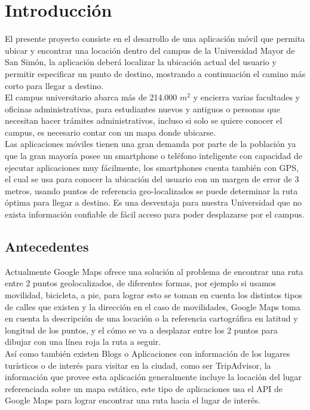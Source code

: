 \chapter{Introducción} %
\label{cha:introduccion}

El presente proyecto consiste en el desarrollo de una aplicación móvil que permita ubicar y encontrar una locación dentro del campus de la Universidad Mayor de San Simón, la aplicación deberá localizar la ubicación actual del usuario y permitir especificar un punto de destino, mostrando a continuación el camino más corto para llegar a destino.\\

El campus universitario abarca más de \num{214,000} $m^2$ y encierra varias facultades y oficinas administrativas, para estudiantes nuevos y antiguos o personas que
necesitan hacer trámites administrativos, incluso si solo se quiere conocer el
campus, es necesario contar con un mapa donde ubicarse.\\

Las aplicaciones móviles tienen una gran demanda por parte de la población ya
que la gran mayoría posee un smartphone o teléfono inteligente con capacidad de
ejecutar aplicaciones muy fácilmente, los smartphones cuenta también con GPS,
el cual se usa para conocer la ubicación del usuario con un margen de error de
3 metros, usando puntos de referencia geo-localizados se puede determinar la
ruta óptima para llegar a destino. Es una desventaja para nuestra Universidad que no exista información confiable de fácil acceso para poder desplazarse por el campus.\\

  \section{Antecedentes} %
  \label{sec:antecedentes}
  Actualmente Google Maps ofrece una solución al problema de encontrar una ruta entre 2 puntos geolocalizados, de diferentes formas, por ejemplo si usamos movilidad, bicicleta, a pie, para lograr esto se toman en cuenta los distintos tipos de calles que existen y la dirección en el caso de movilidades, Google Maps toma en cuenta la descripción de una locación o la referencia cartográfica en latitud y longitud de los puntos, y el cómo se va a desplazar entre los 2 puntos para dibujar con una línea roja la ruta a seguir.\\


  Así como también existen Blogs o Aplicaciones con información de los lugares turísticos o de interés para visitar en la ciudad, como ser TripAdvisor, la información que provee esta aplicación generalmente incluye la locación del lugar referenciada sobre un mapa estático, este tipo de aplicaciones usa el API de Google Maps para lograr encontrar una ruta hacia el lugar de interés.\\


